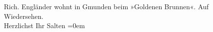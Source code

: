 \begin{ledgroupsized}[t]{13cm}
                  Rich. Engländer wohnt in Gmunden beim »Goldenen
                  Brunnen«.\pend
           \pstart
           Auf Wiedersehen.{\\[\baselineskip]}Herzlichst Ihr \spacefill\mbox{Salten}\pend
           \leftskip=0em{}
         
         \endnumbering{}\end{ledgroupsized}\begin{anhang}\end{anhang}\newcommand{\dateiname}{L03131}\newcommand{\titel}{Felix Salten an Arthur Schnitzler, 27. 7. 1895}\newcommand{\editorInnen}{Martin Anton Müller und Laura Untner}
      